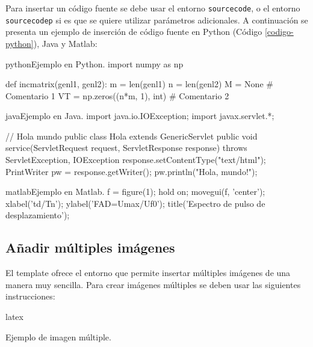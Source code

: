 		Para insertar un código fuente se debe usar el entorno \texttt{sourcecode}, o el entorno \texttt{sourcecodep} si es que se quiere utilizar parámetros adicionales. A continuación se presenta un ejemplo de inserción de código fuente en Python (Código \ref{codigo-python}), Java y Matlab:

\begin{sourcecode}[\label{codigo-python}]{python}{Ejemplo en Python.}
import numpy as np

def incmatrix(genl1, genl2):
	m = len(genl1)
	n = len(genl2)
	M = None # Comentario 1
	VT = np.zeros((n*m, 1), int) # Comentario 2
\end{sourcecode}

\begin{sourcecode}[]{java}{Ejemplo en Java.}
import java.io.IOException;
import javax.servlet.*;

// Hola mundo
public class Hola extends GenericServlet {
	public void service(ServletRequest request, ServletResponse response)
	throws ServletException, IOException{
		response.setContentType("text/html");
		PrintWriter pw = response.getWriter();
		pw.println("Hola, mundo!");
	}
}
\end{sourcecode}

\begin{sourcecode}{matlab}{Ejemplo en Matlab.}
f = figure(1); hold on; movegui(f, 'center');
xlabel('td/Tn'); ylabel('FAD=Umax/Uf0');
title('Espectro de pulso de desplazamiento');
\end{sourcecode}

	\subsection{Añadir múltiples imágenes}

	El template ofrece el entorno \href{https://latex.ppizarror.com/informe.html#hlp-images}{} que permite insertar múltiples imágenes de una manera muy sencilla. Para crear imágenes múltiples se deben usar las siguientes instrucciones:

\begin{sourcecode}{latex}{}
\begin{images}[\label{imagenmultiple}]{Ejemplo de imagen múltiple.}
	\imagesnewline
\end{images}
\end{sourcecode}

